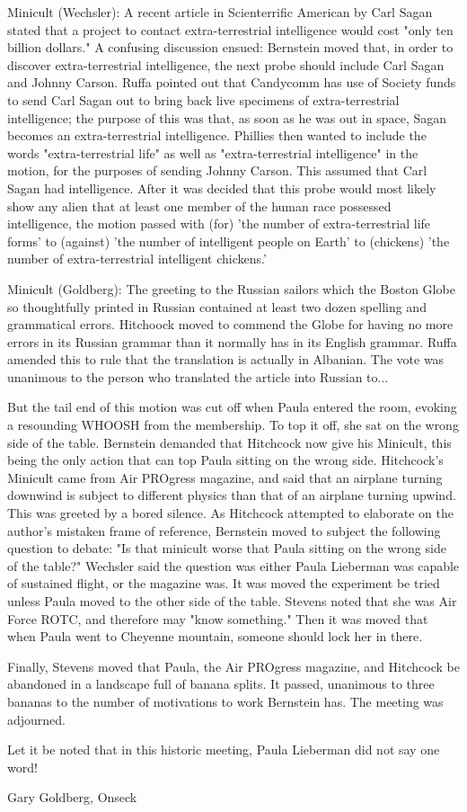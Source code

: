 \documentclass[12pt]{article}
\begin{document}
Minicult (Wechsler): A recent article in Scienterrific American by Carl Sagan stated that a project to contact extra-terrestrial intelligence would cost "only ten billion dollars." A confusing discussion ensued: Bernstein moved that, in order to discover extra-terrestrial intelligence, the next probe should include Carl Sagan and Johnny Carson. Ruffa pointed out that Candycomm has use of Society funds to send Carl Sagan out to bring back live specimens of extra-terrestrial intelligence; the purpose of this was that, as soon as he was out in space, Sagan becomes an extra-terrestrial intelligence. Phillies then wanted to include the words "extra-terrestrial life" as well as "extra-terrestrial intelligence" in the motion, for the purposes of sending Johnny Carson. This assumed that Carl Sagan had intelligence. After it was decided that this probe would most likely show any alien that at least one member of the human race possessed intelligence, the motion passed with (for) 'the number of extra-terrestrial life forms' to (against) 'the number of intelligent people on Earth' to (chickens) 'the number of extra-terrestrial intelligent chickens.'

Minicult (Goldberg): The greeting to the Russian sailors which the Boston Globe so thoughtfully printed in Russian contained at least two dozen spelling and grammatical errors. Hitchoock moved to commend the Globe for having no more errors in its Russian grammar than it normally has in its English grammar. Ruffa amended this to rule that the translation is actually in Albanian. The vote was unanimous to the person who translated the article into Russian to...

But the tail end of this motion was cut off when Paula entered the room, evoking a resounding WHOOSH from the membership. To top it off, she sat on the wrong side of the table. Bernstein demanded that Hitchcock now give his Minicult, this being the only action that can top Paula sitting on the wrong side. Hitchcock's Minicult came from Air PROgress magazine, and said that an airplane turning downwind is subject to different physics than that of an airplane turning upwind. This was greeted by a bored silence. As Hitchcock attempted to elaborate on the author's mistaken frame of reference, Bernstein moved to subject the following question to debate: "Is that minicult worse that Paula sitting on the wrong side of the table?" Wechsler said the question was either Paula Lieberman was capable of sustained flight, or the magazine was. It was moved the experiment be tried unless Paula moved to the other side of the table. Stevens noted that she was Air Force ROTC, and therefore may "know something." Then it was moved that when Paula went to Cheyenne mountain, someone should lock her in there.

Finally, Stevens moved that Paula, the Air PROgress magazine, and Hitchcock be abandoned in a landscape full of banana splits. It passed, unanimous to three bananas to the number of motivations to work Bernstein has. The meeting was adjourned.

Let it be noted that in this historic meeting, Paula Lieberman did not say one word!

\vspace{12pt}

\centerline{Gary Goldberg, Onseck}
\end{document}
